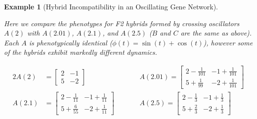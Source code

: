 \documentclass{article}
\newcommand{\1}{\mathbbm{1}}
\newtheorem{example}{Example}
\begin{document}
  \begin{example}[Hybrid Incompatibility in an Oscillating Gene Network] \label{ex:hybrid_osc}

Here we compare the phenotypes for F2 hybrids formed by crossing oscillators $A(2)$ with $A(2.01)$, $A(2.1)$, and $A(2.5)$ ($B$ and $C$ are the same as above). 
Each $A$ is phenotypically identical ($\phi(t) = \sin(t) + \cos(t)$), however some of the hybrids exhibit markedly different dynamics. 


\begin{alignat*}{2}
      A(2) &= \left[\begin{array}{cc} 2 & -1 \\[6pt] 5 & -2 \end{array}\right] &&\qquad A(2.01) = \left[\begin{array}{cc} 2 -\frac{1}{101} & -1 + \frac{1}{101} \\[6pt] 5 + \frac{1}{99} & -2 + \frac{1}{101} \end{array}\right] \\
        A(2.1) &= \left[\begin{array}{cc} 2 - \frac{1}{11} & -1 + \frac{1}{11} \\[6pt] 5 + \frac{6}{55} & -2 + \frac{1}{11} \end{array}\right] &&\qquad A(2.5) = \left[\begin{array}{cc} 2 - \frac{1}{3} & -1 + \frac{1}{3} \\[6pt] 5 + \frac{2}{3} & -2 + \frac{1}{3} \end{array}\right]
\end{alignat*}


\end{example}
\end{document}
